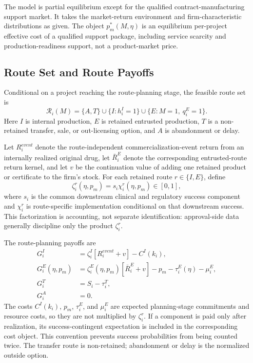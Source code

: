\documentclass[12pt]{article}
\newcommand{\1}{\mathbf{1}}
\newcommand{\calR}{\mathcal{R}}
\begin{document}
The model is partial equilibrium except for the qualified contract-manufacturing support market. It takes the market-return environment and firm-characteristic distributions as given. The object $p_m^*(M,\eta)$ is an equilibrium per-project effective cost of a qualified support package, including service scarcity and production-readiness support, not a product-market price.

\subsection{Route Set and Route Payoffs}

Conditional on a project reaching the route-planning stage, the feasible route set is
\begin{equation}
    \calR_i(M)=
    \{A,T\}\cup \{I:h_i^I=1\}\cup \{E:M=1,\ q_i^E=1\}.
    \label{eq:routeset}
\end{equation}
Here $I$ is internal production, $E$ is retained entrusted production, $T$ is a non-retained transfer, sale, or out-licensing option, and $A$ is abandonment or delay.

Let $R_i^{event}$ denote the route-independent commercialization-event return from an internally realized original drug, let $\bar R_i^E$ denote the corresponding entrusted-route return kernel, and let $v$ be the continuation value of adding one retained product or certificate to the firm's stock. For each retained route $r\in\{I,E\}$, define
\begin{equation}
    \zeta_i^r(\eta,p_m)=s_i\chi_i^r(\eta,p_m)\in[0,1],
    \label{eq:zeta_decomposition}
\end{equation}
where $s_i$ is the common downstream clinical and regulatory success component and $\chi_i^r$ is route-specific implementation conditional on that downstream success. This factorization is accounting, not separate identification: approval-side data generally discipline only the product $\zeta_i^r$.

The route-planning payoffs are
\begin{align}
    G_i^I
    &=\zeta_i^I\left[R_i^{event}+v\right]-C^I(k_i),
    \label{eq:GI}\\
    G_i^E(\eta,p_m)
    &=\zeta_i^E(\eta,p_m)\left[\bar R_i^E+v\right]
      -p_m-\tau_i^E(\eta)-\mu_i^E,
    \label{eq:GE}\\
    G_i^T&=S_i-\tau_i^T,
    \label{eq:GT}\\
    G_i^A&=0.
    \label{eq:GA}
\end{align}
The costs $C^I(k_i)$, $p_m$, $\tau_i^E$, and $\mu_i^E$ are expected planning-stage commitments and resource costs, so they are not multiplied by $\zeta_i^r$. If a component is paid only after realization, its success-contingent expectation is included in the corresponding cost object. This convention prevents success probabilities from being counted twice. The transfer route is non-retained; abandonment or delay is the normalized outside option.
\end{document}
